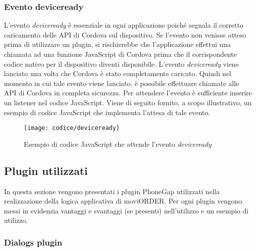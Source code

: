 \subsubsection{Evento deviceready}

L'evento \textit{deviceready} è essenziale in ogni applicazione poiché segnala il corretto caricamento delle API di Cordova sul dispositivo. Se l'evento non venisse atteso prima di utilizzare un plugin, si rischierebbe che l'applicazione effettui una chiamata ad una funzione JavaScript di Cordova prima che il corrispondente codice nativo per il dispositivo diventi disponibile. L'evento \textit{deviceready} viene lanciato una volta che Cordova è stato completamente caricato. Quindi nel momento in cui tale evento viene lanciato, è possibile effettuare chiamate alle API di Cordova in completa sicurezza. Per attendere l'evento è sufficiente inserire un listener nel codice JavaScript. Viene di seguito fornito, a scopo illustrativo, un esempio di codice JavaScript che implementa l'attesa di tale evento.

\begin{figure}[!h] 
    \centering 
    \texttt{[image: codice/deviceready]} 
    \caption{Esempio di codice JavaScript che attende l'evento \textit{deviceready}}
\end{figure}

\subsection{Plugin utilizzati}

In questa sezione vengono presentati i plugin PhoneGap utilizzati nella realizzazione della logica applicativa di moviORDER. Per ogni plugin vengono messi in evidenzia vantaggi e svantaggi (se presenti) nell'utilizzo e un esempio di utilizzo.

\subsubsection{Dialogs plugin}

